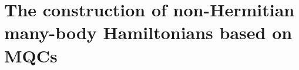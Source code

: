 \documentclass[longbibliography, aps, prx, amsmath, amssymb, amsfonts, twocolumn,superscriptaddress, footinbib]{revtex4-1}
\begin{document}
	\section{The construction of non-Hermitian many-body Hamiltonians based on MQCs}
\end{document}
